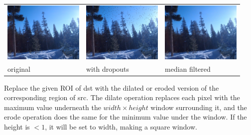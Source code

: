 \spc \begin{tabular}{lll}
\includegraphics[width=1.5in]{figures/tahoe-small.jpg} &
\includegraphics[width=1.5in]{figures/tahoe-pepper.jpg} &
\includegraphics[width=1.5in]{figures/tahoe-pepper-median.jpg} \\
original & with dropouts & median filtered \\
\end{tabular}

\apiend


 
 

Replace the given ROI of {\cf dst} with the dilated or eroded version of the
corresponding region of {\cf src}.  The dilate operation replaces each pixel
with the maximum value underneath the $\mathit{width} \times \mathit{height}$
window surrounding it, and the erode operation does the same for the minimum
value under the window. If the height is $< 1$, it will be set to width,
making a square window.

